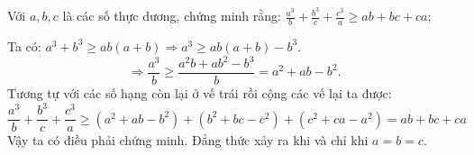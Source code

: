 \begin{problem}
	Với $a, b, c$ là các số thực dương, chứng minh rằng:
	$\displaystyle \frac{a^3}{b} + \frac{b^3}{c} + \frac{c^3}{a} \ge ab + bc + ca$;
	\solution
	
		Ta có: $a^3 + b^3 \ge ab(a + b) \Rightarrow a^3 \ge ab(a + b) - b^3$.
		$$
		\Rightarrow \displaystyle \frac{a^3}{b} \ge \frac{a^2b + ab^2 - b^3}{b} = 
		a^2 + ab - b^2.
		$$
		Tương tự với các số hạng còn lại ở vế trái rồi cộng các vế lại ta được:
		$$\frac{a^3}{b} + \frac{b^3}{c} + \frac{c^3}{a} \ge 
		(a^2 + ab - b^2) + (b^2 + bc - c^2) + (c^2 + ca - a^2) = ab + bc + ca$$
		Vậy ta có điều phải chứng minh. Đẳng thức xảy ra khi và chỉ khi $a = b = c$.
\end{problem}